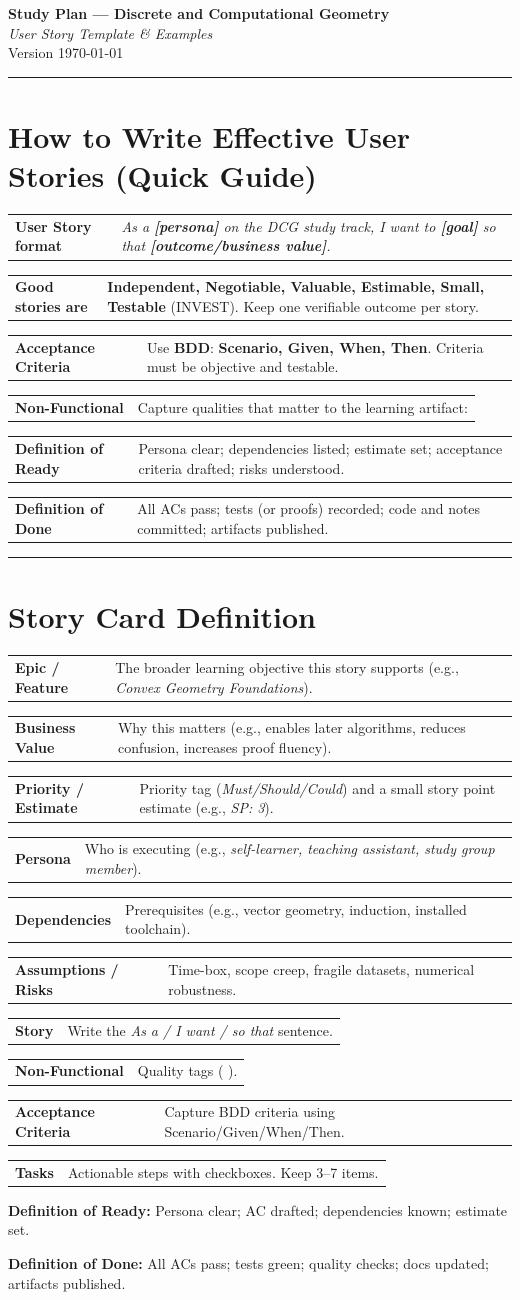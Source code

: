 \documentclass[11pt,a4paper]{article}
\makeatletter
\newcommand{\FieldRow}[2]{%
  \noindent\begin{tabularx}{\linewidth}{@{}>{\bfseries}l X@{}}#1 & #2\\\end{tabularx}%
}
\newcommand{\CardDivider}{\par\noindent\color{CardBorder}\rule{\linewidth}{0.4pt}\par\noindent\color{black}}
\newcommand{\DefinitionLine}[2]{%
  {\footnotesize\color{Muted}\textbf{#1:} #2}%
}
\makeatother
\begin{document}
\begin{center}
  {\huge \bfseries Study Plan — Discrete and Computational Geometry}\\[0.25em]
  {\large \itshape User Story Template \& Examples}\\[0.5em]
  \normalsize Version \today
\end{center}

\CardDivider

\section*{How to Write Effective User Stories (Quick Guide)}
\begin{StoryCardBox}
\FieldRow{User Story format}{\emph{As a \textbf{[persona]} on the DCG study track, I want to \textbf{[goal]} so that \textbf{[outcome/business value]}.}}
\FieldRow{Good stories are}{\textbf{Independent, Negotiable, Valuable, Estimable, Small, Testable} (INVEST). Keep one verifiable outcome per story.}
\FieldRow{Acceptance Criteria}{Use \textbf{BDD}: \textbf{Scenario, Given, When, Then}. Criteria must be objective and testable.}
\FieldRow{Non-Functional}{Capture qualities that matter to the learning artifact: \nfchip{Rigor} \nfchip{Reproducibility} \nfchip{Clarity} \nfchip{Performance}}
\FieldRow{Definition of Ready}{Persona clear; dependencies listed; estimate set; acceptance criteria drafted; risks understood.}
\FieldRow{Definition of Done}{All ACs pass; tests (or proofs) recorded; code and notes committed; artifacts published.}
\end{StoryCardBox}

\CardDivider

\section*{Story Card Definition}
\begin{StoryCardBox}
\FieldRow{Epic / Feature}{The broader learning objective this story supports (e.g., \emph{Convex Geometry Foundations}).}
\FieldRow{Business Value}{Why this matters (e.g., enables later algorithms, reduces confusion, increases proof fluency).}
\FieldRow{Priority / Estimate}{Priority tag (\emph{Must/Should/Could}) and a small story point estimate (e.g., \emph{SP: 3}).}
\FieldRow{Persona}{Who is executing (e.g., \emph{self-learner, teaching assistant, study group member}).}
\FieldRow{Dependencies}{Prerequisites (e.g., vector geometry, induction, installed toolchain).}
\FieldRow{Assumptions / Risks}{Time-box, scope creep, fragile datasets, numerical robustness.}
\FieldRow{Story}{Write the \emph{As a / I want / so that} sentence.}
\FieldRow{Non-Functional}{Quality tags (\nfchip{Rigor} \nfchip{Reproducibility} \nfchip{Clarity} \nfchip{Accessibility} \nfchip{Privacy}).}
\FieldRow{Acceptance Criteria}{Capture BDD criteria using Scenario/Given/When/Then.}
\FieldRow{Tasks}{Actionable steps with checkboxes. Keep 3--7 items.}
\DefinitionLine{Definition of Ready}{Persona clear; AC drafted; dependencies known; estimate set.}\par
\DefinitionLine{Definition of Done}{All ACs pass; tests green; quality checks; docs updated; artifacts published.}
\end{StoryCardBox}
\end{document}
